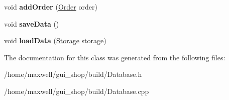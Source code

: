 \begin{DoxyCompactItemize}
\item 
void {\bfseries add\+Order} (\hyperlink{classOrder}{Order} order)\hypertarget{classDatabase_ad5a3b7a09c8ba009dc46c4d8a3e54954}{}\label{classDatabase_ad5a3b7a09c8ba009dc46c4d8a3e54954}

\item 
void {\bfseries save\+Data} ()\hypertarget{classDatabase_a4bfbcd31b36245c9a26b72df1d981e47}{}\label{classDatabase_a4bfbcd31b36245c9a26b72df1d981e47}

\item 
void {\bfseries load\+Data} (\hyperlink{classStorage}{Storage} storage)\hypertarget{classDatabase_a292b82b6274b9b1e50154e76d3d67174}{}\label{classDatabase_a292b82b6274b9b1e50154e76d3d67174}

\end{DoxyCompactItemize}


The documentation for this class was generated from the following files\+:\begin{DoxyCompactItemize}
\item 
/home/maxwell/gui\+\_\+shop/build/Database.\+h\item 
/home/maxwell/gui\+\_\+shop/build/Database.\+cpp\end{DoxyCompactItemize}
